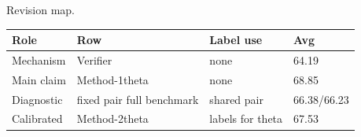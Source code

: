 Revision map.
\begin{tabular}{llll}
Role & Row & Label use & Avg \\
\midrule
Mechanism & Verifier & none & 64.19 \\
Main claim & Method-1theta & none & 68.85 \\
Diagnostic & fixed pair full benchmark & shared pair & 66.38/66.23 \\
Calibrated & Method-2theta & labels for theta & 67.53 \\
\end{tabular}
